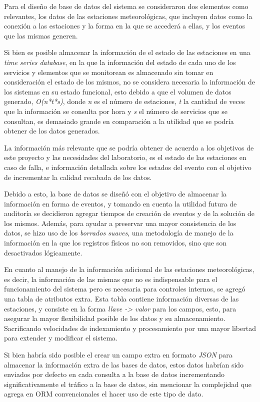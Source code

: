 Para el diseño de base de datos del sistema se consideraron dos elementos como relevantes, los datos de las estaciones meteorológicas, que incluyen datos como la conexión a las estaciones y la forma en la que se accederá a ellas, y los eventos que las mismas generen.

Si bien es posible almacenar la información de el estado de las estaciones en una \textit{time series database}, en la que la información del estado de cada uno de los servicios y elementos que se monitorean es almacenado sin tomar en consideración el estado de los mismos, no se considera necesaria la información de los sistemas en su estado funcional, esto debido a que el volumen de datos generado, \textit{O(n*t*s)}, donde \textit{n} es el número de estaciones, \textit{t} la cantidad de veces que la información se consulta por hora y \textit{s} el número de servicios que se consultan, es demasiado grande en comparación a la utilidad que se podría obtener de los datos generados.

La información más relevante que se podría obtener de acuerdo a los objetivos de este proyecto y las necesidades del laboratorio, es el estado de las estaciones en caso de falla, e información detallada sobre los estados del evento con el objetivo de incrementar la calidad recabada de los datos.

Debido a esto, la base de datos se diseñó con el objetivo de almacenar la información en forma de eventos, y tomando en cuenta la utilidad futura de auditoría se decidieron agregar tiempos de creación de eventos y de la solución de los mismos. Además, para ayudar a preservar una mayor consistencia de los datos, se hizo uso de los \textit{borrados suaves}, una metodología de manejo de la información en la que los registros físicos no son removidos, sino que son desactivados lógicamente.

En cuanto al manejo de la información adicional de las estaciones meteorológicas, es decir, la información de las mismas que no es indispensable para el funcionamiento del sistema pero es necesaria para controles internos, se agregó una tabla de atributos extra. Esta tabla contiene información diversas de las estaciones, y consiste en la forma \textit{llave -> valor} para los campos, esto, para asegurar la mayor flexibilidad posible de los datos y su almacenamiento. Sacrificando velocidades de indexamiento y procesamiento por una mayor libertad para extender y modificar el sistema.

Si bien habría sido posible el crear un campo extra en formato \textit{JSON} para almacenar la información extra de las bases de datos, estos datos habrían sido enviados por defecto en cada consulta a la base de datos incrementando significativamente el tráfico a la base de datos, sin mencionar la complejidad que agrega en ORM convencionales el hacer uso de este tipo de dato.

